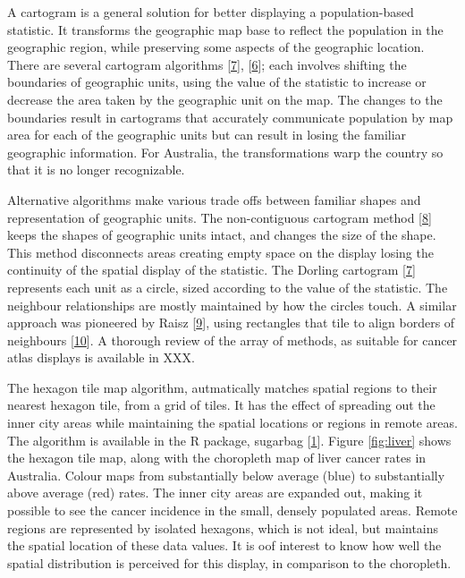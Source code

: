 \documentclass[conference,final,]{IEEEtran}
\begin{document}
A cartogram is a general solution for better displaying a population-based statistic. It transforms the geographic map base to reflect the population in the geographic region, while preserving some aspects of the geographic location. There are several cartogram algorithms {[}\protect\hyperlink{ref-ACTUC}{7}{]}, {[}\protect\hyperlink{ref-CBATCC}{6}{]}; each involves shifting the boundaries of geographic units, using the value of the statistic to increase or decrease the area taken by the geographic unit on the map. The changes to the boundaries result in cartograms that accurately communicate population by map area for each of the geographic units but can result in losing the familiar geographic information. For Australia, the transformations warp the country so that it is no longer recognizable.

Alternative algorithms make various trade offs between familiar shapes and representation of geographic units. The non-contiguous cartogram method {[}\protect\hyperlink{ref-NAC}{8}{]} keeps the shapes of geographic units intact, and changes the size of the shape. This method disconnects areas creating empty space on the display losing the continuity of the spatial display of the statistic. The Dorling cartogram {[}\protect\hyperlink{ref-ACTUC}{7}{]} represents each unit as a circle, sized according to the value of the statistic. The neighbour relationships are mostly maintained by how the circles touch. A similar approach was pioneered by Raisz {[}\protect\hyperlink{ref-RSCW}{9}{]}, using rectangles that tile to align borders of neighbours {[}\protect\hyperlink{ref-CDWCS}{10}{]}. A thorough review of the array of methods, as suitable for cancer atlas displays is available in XXX.

The hexagon tile map algorithm, autmatically matches spatial regions to their nearest hexagon tile, from a grid of tiles. It has the effect of spreading out the inner city areas while maintaining the spatial locations or regions in remote areas. The algorithm is available in the R package, sugarbag {[}\protect\hyperlink{ref-sugarbag}{1}{]}. Figure \ref{fig:liver} shows the hexagon tile map, along with the choropleth map of liver cancer rates in Australia. Colour maps from substantially below average (blue) to substantially above average (red) rates. The inner city areas are expanded out, making it possible to see the cancer incidence in the small, densely populated areas. Remote regions are represented by isolated hexagons, which is not ideal, but maintains the spatial location of these data values. It is oof interest to know how well the spatial distribution is perceived for this display, in comparison to the choropleth.
\end{document}
